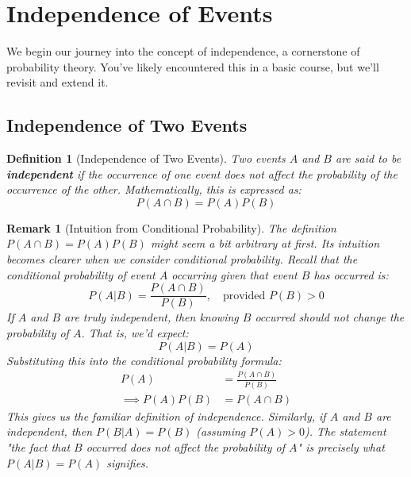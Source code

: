 \documentclass[11pt]{article}
\newtheorem{definition}[theorem]{Definition}
\newtheorem{remark}[theorem]{Remark}
\begin{document}
\section{Independence of Events}

We begin our journey into the concept of independence, a cornerstone of probability theory. You've likely encountered this in a basic course, but we'll revisit and extend it.

\subsection{Independence of Two Events}

\begin{definition}[Independence of Two Events]
Two events $A$ and $B$ are said to be \textbf{independent} if the occurrence of one event does not affect the probability of the occurrence of the other. Mathematically, this is expressed as:
\begin{equation}
P(A \cap B) = P(A)P(B)
\end{equation}
\end{definition}

\begin{remark}[Intuition from Conditional Probability]
The definition $P(A \cap B) = P(A)P(B)$ might seem a bit arbitrary at first. Its intuition becomes clearer when we consider conditional probability.
Recall that the conditional probability of event $A$ occurring given that event $B$ has occurred is:
\begin{equation}
P(A|B) = \frac{P(A \cap B)}{P(B)}, \quad \text{provided } P(B) > 0
\end{equation}
If $A$ and $B$ are truly independent, then knowing $B$ occurred should not change the probability of $A$. That is, we'd expect:
\begin{equation}
P(A|B) = P(A)
\end{equation}
Substituting this into the conditional probability formula:
\begin{align*}
P(A) &= \frac{P(A \cap B)}{P(B)} \\
\implies P(A)P(B) &= P(A \cap B)
\end{align*}
This gives us the familiar definition of independence. Similarly, if $A$ and $B$ are independent, then $P(B|A) = P(B)$ (assuming $P(A)>0$).
The statement "the fact that $B$ occurred does not affect the probability of $A$" is precisely what $P(A|B) = P(A)$ signifies.
\end{remark}
\end{document}
